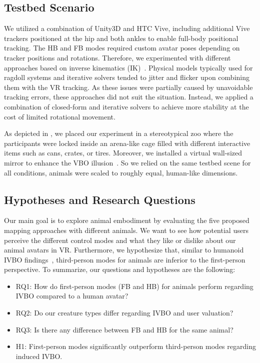 \documentclass[conference]{IEEEtran}
\begin{document}
\subsection{Testbed Scenario}

We utilized a combination of Unity3D and HTC Vive, including additional Vive trackers positioned at the hip and both ankles to enable full-body positional tracking. The HB and FB modes required custom avatar poses depending on tracker positions and rotations. Therefore, we experimented with different approaches based on inverse kinematics (IK)~\cite{buss2004introduction}. Physical models typically used for ragdoll systems and iterative solvers tended to jitter and flicker upon combining them with the VR tracking. As these issues were partially caused by unavoidable tracking errors, these approaches did not suit the situation. Instead, we applied a combination of closed-form and iterative solvers to achieve more stability at the cost of limited rotational movement. 

As depicted in , we placed our experiment in a stereotypical zoo where the participants were locked inside an arena-like cage filled with different interactive items such as cans, crates, or tires. Moreover, we installed a virtual wall-sized mirror to enhance the VBO illusion~\cite{latoschik2016fakemi}. So we relied on the same testbed scene for all conditions, animals were scaled to roughly equal, human-like dimensions.




\subsection{Hypotheses and Research Questions}

Our main goal is to explore animal embodiment by evaluating the five proposed mapping approaches with different animals. We want to see how potential users perceive the different control modes and what they like or dislike about our animal avatars in VR. Furthermore, we hypothesize that, similar to humanoid IVBO findings~\cite{galvan2015characterizing}, third-person modes for animals are inferior to the first-person perspective. To summarize, our questions and hypotheses are the following:
\begin{itemize}
  \setlength{\itemsep}{2pt}
  \setlength{\parskip}{0pt}
  \setlength{\parsep}{0pt}
\item RQ1: How do first-person modes (FB and HB) for animals perform regarding IVBO compared to a human avatar?
\item RQ2: Do our creature types differ regarding IVBO and user valuation?
\item RQ3: Is there any difference between FB and HB for the same animal?
\item H1: First-person modes significantly outperform third-person modes regarding induced IVBO.
\end{itemize}
\end{document}
